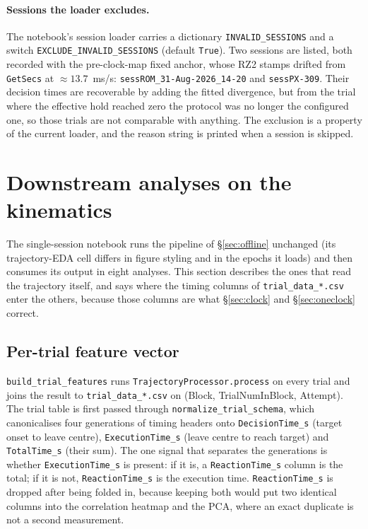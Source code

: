 \documentclass[11pt,a4paper]{article}
\newcommand{\code}[1]{\texttt{\small #1}}
\begin{document}
\paragraph{Sessions the loader excludes.} The notebook's session loader carries
a dictionary \code{INVALID\_SESSIONS} and a switch
\code{EXCLUDE\_INVALID\_SESSIONS} (default \code{True}). Two sessions are listed,
both recorded with the pre-clock-map fixed anchor, whose RZ2 stamps drifted from
\code{GetSecs} at $\approx 13.7$~ms/s: \code{sessROM\_31-Aug-2026\_14-20} and
\code{sessPX-309}. Their decision times are recoverable by adding the fitted
divergence, but from the trial where the effective hold reached zero the
protocol was no longer the configured one, so those trials are not comparable
with anything. The exclusion is a property of the current loader, and the reason
string is printed when a session is skipped.

\section{Downstream analyses on the kinematics}
\label{sec:downstream}

The single-session notebook runs the pipeline of \S\ref{sec:offline} unchanged
(its trajectory-EDA cell differs in figure styling and in the epochs it loads)
and then consumes its output in eight analyses. This section describes the ones
that read the trajectory itself, and says where the timing columns of
\code{trial\_data\_*.csv} enter the others, because those columns are what
\S\ref{sec:clock} and \S\ref{sec:oneclock} correct.

\subsection{Per-trial feature vector}

\code{build\_trial\_features} runs \code{TrajectoryProcessor.process} on every
trial and joins the result to \code{trial\_data\_*.csv} on
(Block, TrialNumInBlock, Attempt). The trial table is first passed through
\code{normalize\_trial\_schema}, which canonicalises four generations of timing
headers onto \code{DecisionTime\_s} (target onset to leave centre),
\code{ExecutionTime\_s} (leave centre to reach target) and \code{TotalTime\_s}
(their sum). The one signal that separates the generations is whether
\code{ExecutionTime\_s} is present: if it is, a \code{ReactionTime\_s} column is
the total; if it is not, \code{ReactionTime\_s} is the execution time.
\code{ReactionTime\_s} is dropped after being folded in, because keeping both
would put two identical columns into the correlation heatmap and the PCA, where
an exact duplicate is not a second measurement.
\end{document}
